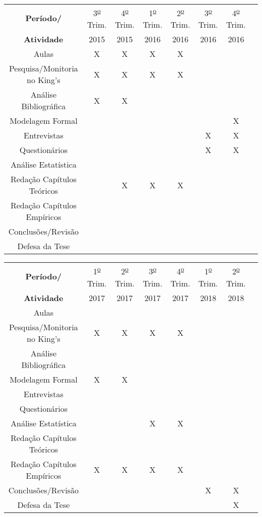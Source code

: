 \documentclass[a4paper,11pt]{article}
\begin{document}
\vspace{1cm}
{\scriptsize \begin{tabular}{|c|c|c|c|c|c|c|c|}
\hline \textbf{Período/} & 3\textsuperscript{\underline{o}} Trim. & 4\textsuperscript{\underline{o}} Trim. & 1\textsuperscript{\underline{o}} Trim.  & 2\textsuperscript{\underline{o}} Trim. & 3\textsuperscript{\underline{o}} Trim. & 4\textsuperscript{\underline{o}} Trim.\\ 
\textbf{Atividade} & 2015 & 2015 & 2016 & 2016 & 2016 & 2016\\ 
\hline Aulas & X & X & X& X& &\\
\hline Pesquisa/Monitoria no King's & X & X & X& X& & \\
\hline Análise Bibliográfica & X & X & & & & \\
\hline Modelagem Formal &  &  &  &  &  & X \\
\hline Entrevistas &  &  & &  & X & X\\
\hline Questionários &  &  &  &  & X & X\\
\hline Análise Estatística &  &  & &  &  &\\
\hline Redação Capítulos Teóricos &  & X & X & X &  & \\
\hline Redação Capítulos Empíricos &  & &  &  &  & \\
\hline Conclusões/Revisão & &  & & & & \\
\hline Defesa da Tese &  &  &  & &  & \\
\hline
\end{tabular} }

\vspace{1cm}
{\scriptsize \begin{tabular}{|c|c|c|c|c|c|c|c|}
\hline \textbf{Período/} & 1\textsuperscript{\underline{o}} Trim. & 2\textsuperscript{\underline{o}} Trim. & 3\textsuperscript{\underline{o}} Trim.  & 4\textsuperscript{\underline{o}} Trim. & 1\textsuperscript{\underline{o}} Trim. & 2\textsuperscript{\underline{o}} Trim.\\ 
\textbf{Atividade} & 2017 & 2017 & 2017 & 2017 & 2018 & 2018\\ 
\hline Aulas &  &  & & & &\\
\hline Pesquisa/Monitoria no King's & X & X & X & X & & \\
\hline Análise Bibliográfica &  &  & & & & \\
\hline Modelagem Formal & X & X &  & &  &  \\
\hline Entrevistas &  &  & & &  &\\
\hline Questionários &  &  & & &  &\\
\hline Análise Estatística &  & & X & X & &\\
\hline Redação Capítulos Teóricos &  & &  &  &  & \\
\hline Redação Capítulos Empíricos & X & X & X & X & & \\
\hline Conclusões/Revisão & &  & & & X & X \\
\hline Defesa da Tese &  &  &  & &  & X\\
\hline
\end{tabular} 
}

\newpage



\end{document}
